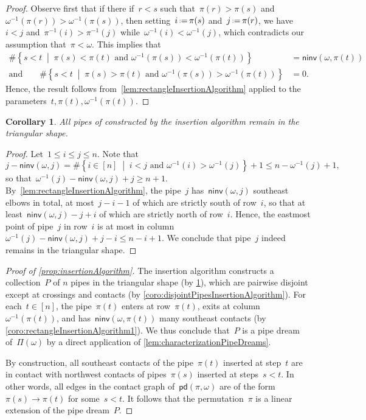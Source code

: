 \documentclass[reqno]{amsart}
\newtheorem{corollary}[theorem]{Corollary}
\theoremstyle{definition}
\newcommand{\set}[2]{\left\{ #1 \;\middle|\; #2 \right\}} %
\newcommand{\eqdef}{\mbox{\,\raisebox{0.2ex}{\scriptsize\ensuremath{\mathrm:}}\ensuremath{=}\,}} %
\newcommand{\pipeDreams}{\Pi} %
\newcommand{\noninversions}[2]{\mathsf{ninv}(#1,#2)} %
\newcommand{\insertion}[2]{\mathsf{pd}(#1,#2)} %
\begin{document}
\begin{proof}
Observe first that if there if~$r < s$ such that~$\pi(r) > \pi(s)$ and~$\omega^{-1}(\pi(r)) > \omega^{-1}(\pi(s))$, then setting~$i \eqdef \pi(s)$ and~$j \eqdef \pi(r)$, we have~${i < j}$ and~$\pi^{-1}(i) > \pi^{-1}(j)$ while~$\omega^{-1}(i) < \omega^{-1}(j)$, which contradicts our assumption that~$\pi < \omega$.
This implies that
\begin{align*}
\# \set{s < t}{\pi(s) < \pi(t) \text{ and } \omega^{-1}(\pi(s)) < \omega^{-1}(\pi(t))} & = \noninversions{\omega}{\pi(t)} \\
\text{and}\qquad \# \set{s < t}{\pi(s) > \pi(t) \text{ and } \omega^{-1}(\pi(s)) > \omega^{-1}(\pi(t))} & = 0.
\end{align*}
Hence, the result follows from~\cref{lem:rectangleInsertionAlgorithm} applied to the parameters~$t, \pi(t), \omega^{-1}(\pi(t))$.
\end{proof}

\begin{corollary}
\label{coro:rectangleInsertionAlgorithm2}
All pipes of constructed by the insertion algorithm remain in the triangular shape.
\end{corollary}

\begin{proof}
Let~$1 \le i \le j \le n$.
Note that
\[
j - \noninversions{\omega}{j} = \#\set{i \in [n]}{i < j \text{ and } \omega^{-1}(i) > \omega^{-1}(j)} + 1 \le n - \omega^{-1}(j) + 1,
\]
so that~$\omega^{-1}(j) - \noninversions{\omega}{j} + j \ge n + 1$.
By~\cref{lem:rectangleInsertionAlgorithm}, the pipe~$j$ has~$\noninversions{\omega}{j}$ southeast elbows in total, at most~$j-i-1$ of which are strictly south of row~$i$, so that at least~$\noninversions{\omega}{j} - j + i$ of which are strictly north of row~$i$.
Hence, the eastmost point of pipe~$j$ in row~$i$ is at most in column~$\omega^{-1}(j) - \noninversions{\omega}{j} + j - i \le n - i + 1$.
We conclude that pipe~$j$ indeed remains in the triangular shape.
\end{proof}

\begin{proof}[Proof of \cref{prop:insertionAlgorithm}]
The insertion algorithm constructs a collection~$P$ of $n$ pipes in the triangular shape (by \cref{coro:rectangleInsertionAlgorithm2}), which are pairwise disjoint except at crossings and contacts (by \cref{coro:disjointPipesInsertionAlgorithm}).
For each~$t \in [n]$, the pipe~$\pi(t)$ enters at row~$\pi(t)$, exits at column~$\omega^{-1}(\pi(t))$, and has~$\noninversions{\omega}{\pi(t)}$ many southeast contacts (by \cref{coro:rectangleInsertionAlgorithm1}).
We thus conclude that~$P$ is a pipe dream of~$\pipeDreams(\omega)$ by a direct application of \cref{lem:characterizationPipeDreams}.

By construction, all southeast contacts of the pipe~$\pi(t)$ inserted at step~$t$ are in contact with northwest contacts of pipes~$\pi(s)$ inserted at steps~$s < t$.
In other words, all edges in the contact graph of~$\insertion{\pi}{\omega}$ are of the form~$\pi(s) \to \pi(t)$ for some~$s < t$.
It follows that the permutation~$\pi$ is a linear extension of the pipe dream~$P$.
\end{proof}
\end{document}
